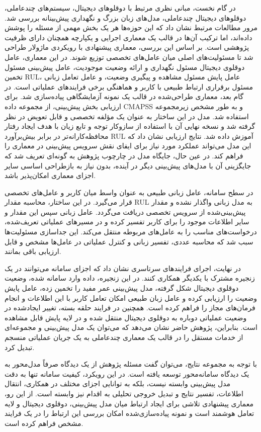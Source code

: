 در گام نخست، مبانی نظری مرتبط با دوقلوهای دیجیتال، سیستم‌های چندعاملی، دوقلوهای دیجیتال چندعاملی، مدل‌های زبان بزرگ و نگهداری پیش‌بینانه بررسی شد. مرور مطالعات مرتبط نشان داد که این حوزه‌ها هر یک بخش مهمی از مسئله را پوشش داده‌اند، اما ترکیب آن‌ها در قالب یک معماری اجرایی و یکپارچه همچنان دارای ظرفیت پژوهشی است. بر اساس این بررسی، معماری پیشنهادی با رویکردی ماژولار طراحی شد تا مسئولیت‌های اصلی میان عامل‌های تخصصی توزیع شوند. در این معماری، عامل دوقلوی دیجیتال مسئول نگهداری و ارائه وضعیت موجودیت، عامل پیش‌بینی مسئول تخمین \gls{RUL}، عامل پایش مسئول مشاهده و پیگیری وضعیت، و عامل تعامل زبانی مسئول برقراری ارتباط طبیعی با کاربر و هماهنگی برخی فرایندهای عملیاتی است.
در گام بعد، معماری طراحی‌شده در قالب یک نمونه آزمایشگاهی پیاده‌سازی شد. برای ارزیابی بخش پیش‌بینی، از مجموعه داده \gls{CMAPSS} و به طور مشخص زیرمجموعه  استفاده شد. مدل  در این ساختار به عنوان یک مؤلفه تخصصی و قابل تعویض در نظر گرفته شد و نسخه نهایی آن با استفاده از سازوکار توجه و تابع زیان  با هدف ایجاد رفتار محافظه‌کارانه‌تر در برابر بیش‌برآورد \gls{RUL} آموزش داده شد. نتایج ارزیابی نشان داد که این مدل می‌تواند عملکرد مورد نیاز برای ایفای نقش سرویس پیش‌بینی در معماری را فراهم کند. در عین حال، جایگاه مدل در چارچوب پژوهش به گونه‌ای تعریف شد که جایگزینی آن با مدل‌های پیش‌بینی دیگر در آینده، بدون نیاز به بازطراحی اساسی سایر اجزای معماری امکان‌پذیر باشد.

در سطح سامانه، عامل زبانی طبیعی به عنوان واسط میان کاربر و عامل‌های تخصصی قرار می‌گیرد. در این ساختار، محاسبه مقدار \gls{RUL} به مدل زبانی واگذار نشده و مقدار پیش‌بینی‌شده از سرویس تخصصی دریافت می‌گردد. عامل زبانی سپس این مقدار و سایر اطلاعات موجود را برای کاربر تفسیر کرده و در مسیرهای عملیاتی تعریف‌شده، درخواست‌های مناسب را به عامل‌های مربوطه منتقل می‌کند. این جداسازی مسئولیت‌ها سبب شد که محاسبه عددی، تفسیر زبانی و کنترل عملیاتی در عامل‌ها مشخص و قابل ارزیابی باقی بمانند.

در نهایت، اجرای فرایندهای سرتاسری نشان داد که اجزای سامانه می‌توانند در یک زنجیره مشترک با یکدیگر همکاری کنند. در این زنجیره، داده وارد سامانه شده، وضعیت دوقلوی دیجیتال شکل گرفته، مدل پیش‌بینی عمر مفید را تخمین زده، عامل پایش وضعیت را ارزیابی کرده و عامل زبان طبیعی امکان تعامل کاربر با این اطلاعات و انجام فرمان‌های مجاز را فراهم کرده است. همچنین در فرایند حلقه بسته، تغییر ایجادشده در وضعیت عملیاتی دوباره به دوقلوی دیجیتال منتقل شده و در لایه پایش قابل مشاهده است. بنابراین، پژوهش حاضر نشان می‌دهد که می‌توان یک مدل پیش‌بینی و مجموعه‌ای از خدمات مستقل را در قالب یک معماری چندعاملی به یک جریان عملیاتی منسجم تبدیل کرد.

با توجه به مجموعه نتایج، می‌توان گفت مسئله پژوهش از یک دیدگاه صرفاً مدل‌محور به یک دیدگاه سامانه‌محور توسعه یافته است. در این رویکرد، کیفیت سامانه تنها به دقت مدل پیش‌بینی وابسته نیست، بلکه به توانایی اجزای مختلف در همکاری، انتقال اطلاعات، تفسیر نتایج و تبدیل خروجی تحلیلی به اقدام نیز وابسته است. از این رو، معماری پیشنهادی تلاشی برای ایجاد ارتباط میان مدل پیش‌بینی، دوقلوی دیجیتال و لایه تعامل هوشمند است و نمونه پیاده‌سازی‌شده امکان بررسی این ارتباط را در یک فرایند مشخص فراهم کرده است.



